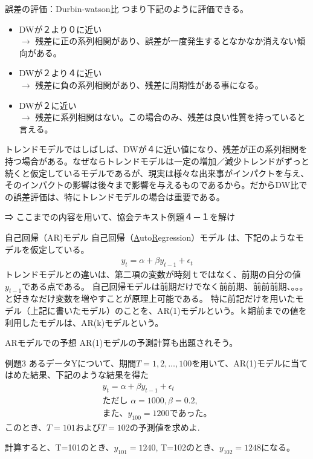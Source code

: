 \documentclass[dvipdfmx,autodetect-engine, unicode, 10pt, aspectratio=169]{beamer}
\begin{document}
\begin{frame}{誤差の評価：Durbin-watson比}
    つまり下記のように評価できる。
    \begin{itemize}
        \item DWが２より０に近い \\$\rightarrow$ 残差に正の系列相関があり、誤差が一度発生するとなかなか消えない傾向がある。
        \item DWが２より４に近い\\ $\rightarrow$ 残差に負の系列相関があり、残差に周期性がある事になる。
        \item DWが２に近い \\$\rightarrow$ 残差に系列相関はない。この場合のみ、残差は良い性質を持っていると言える。
    \end{itemize}
    \small トレンドモデルではしばしば、DWが４に近い値になり、残差が正の系列相関を持つ場合がある。なぜならトレンドモデルは一定の増加／減少トレンドがずっと続くと仮定しているモデルであるが、現実は様々な出来事がインパクトを与え、そのインパクトの影響は後々まで影響を与えるものであるから。だからDW比での誤差評価は、特にトレンドモデルの場合は重要である。

    \normalsize ⇒ ここまでの内容を用いて、協会テキスト例題４－１を解け
\end{frame}
\begin{frame}{自己回帰（AR)モデル}
    自己回帰（\underline{A}uto\underline{R}egression）モデル は、下記のようなモデルを仮定している。
    \begin{align*}
        y_t = \alpha + \beta y_{t-1} + \epsilon_t
    \end{align*}
    トレンドモデルとの違いは、第二項の変数が時刻ｔではなく、前期の自分の値$y_{t-1}$である点である。
    自己回帰モデルは前期だけでなく前前期、前前前期、。。。と好きなだけ変数を増やすことが原理上可能である。
    特に前記だけを用いたモデル（上記に書いたモデル）のことを、AR(1)モデルという。ｋ期前までの値を利用したモデルは、AR(k)モデルという。
    
\end{frame}
\begin{frame}{ARモデルでの予想}
    AR(1)モデルの予測計算も出題されそう。
    \begin{itembox}[i]{例題3}
        あるデータYについて、期間$T=1,2,\dotsc , 100$を用いて、AR(1)モデルに当てはめた結果、下記のような結果を得た
        \begin{align*}
            y_t = \alpha + \beta y_{t-1} + \epsilon_t \\
            \text{ただし  } \alpha = 1000, \beta = 0.2, \\
            \text{また、$y_{100}=1200$であった。}
        \end{align*}
        このとき、$T=101$および$T=102$の予測値を求めよ.
    \end{itembox}
    計算すると、T=101のとき、$y_{101}=1240$, T=102のとき、$y_{102}=1248$になる。
\end{frame}
\end{document}
